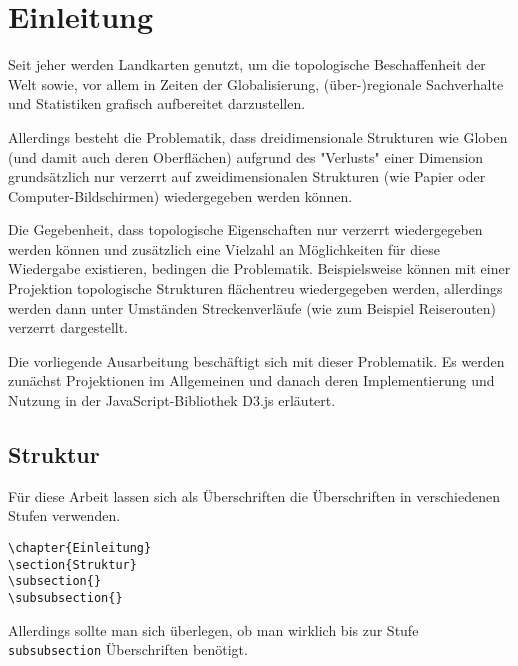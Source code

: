 
\chapter{Einleitung}
\label{ch:introduction}

Seit jeher werden Landkarten genutzt, um die topologische Beschaffenheit der Welt sowie, vor allem in Zeiten der Globalisierung, (über-)regionale Sachverhalte und Statistiken grafisch aufbereitet darzustellen.

Allerdings besteht die Problematik, dass dreidimensionale Strukturen wie Globen (und damit auch deren Oberflächen) aufgrund des "Verlusts" einer Dimension grundsätzlich nur verzerrt auf zweidimensionalen Strukturen (wie Papier oder Computer-Bildschirmen) wiedergegeben werden können.

Die Gegebenheit, dass topologische Eigenschaften nur verzerrt wiedergegeben werden können und zusätzlich eine Vielzahl an Möglichkeiten für diese Wiedergabe existieren, bedingen die Problematik. Beispielsweise können mit einer Projektion topologische Strukturen flächentreu wiedergegeben werden, allerdings werden dann unter Umständen Streckenverläufe (wie zum Beispiel Reiserouten) verzerrt dargestellt. 

Die vorliegende Ausarbeitung beschäftigt sich mit dieser Problematik. Es werden zunächst Projektionen im Allgemeinen und danach deren Implementierung und Nutzung in der JavaScript-Bibliothek D3.js erläutert.

\section{Struktur}
\label{ch:introduction:sec:structure}

Für diese Arbeit lassen sich als Überschriften die Überschriften in verschiedenen Stufen verwenden.

\begin{verbatim}
\chapter{Einleitung}
\section{Struktur}
\subsection{}
\subsubsection{}
\end{verbatim}

Allerdings sollte man sich überlegen, ob man wirklich bis zur Stufe \verb|subsubsection| Überschriften benötigt.

